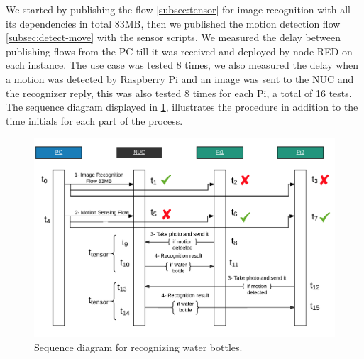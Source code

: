 \noindent We started by publishing the flow \ref{subsec:tensor} for  image recognition with all its dependencies in total 83MB, then we published the motion detection flow \ref{subsec:detect-move} with the sensor scripts. We measured the delay between publishing flows from the PC till it was received and deployed by node-RED on each instance. The use case was tested 8 times, we also measured the delay when a motion was detected by Raspberry Pi and an image was sent to the NUC and the recognizer reply, this was also tested 8 times for each Pi, a total of 16 tests. The sequence diagram displayed in \ref{fig:sd-tensor},  illustrates the procedure in addition to the time initials for each part of the process.  \\



\begin{figure}[H]
	\centering
	\includegraphics[scale=0.6]{images/sequence-diagram.png}
	\caption{Sequence diagram for recognizing water bottles.}
	\label{fig:sd-tensor}
\end{figure} 
 


